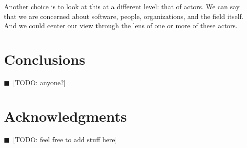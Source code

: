 \documentclass[11pt, oneside]{amsart}
\newcommand{\todo}[1]{{\color{blue}$\blacksquare$~\textsf{[TODO: #1]}}}
\begin{document}
Another choice is to look at this at a different level: that of actors. We can say that we are concerned about software, people, organizations, and the field itself. And we could center our view through the lens of one or more of these actors.


\section{Conclusions} \label{sec:conclusions}

\todo{anyone?}

\section*{Acknowledgments} \label{sec:acks}

\todo{feel free to add stuff here}


\newpage



\end{document}
